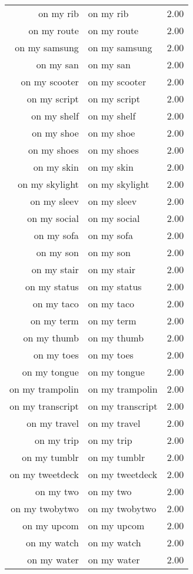 \begin{table}[ht]
\begin{tabular}{rlr}
  on my rib & on my rib & 2.00 \\ 
  on my route & on my route & 2.00 \\ 
  on my samsung & on my samsung & 2.00 \\ 
  on my san & on my san & 2.00 \\ 
  on my scooter & on my scooter & 2.00 \\ 
  on my script & on my script & 2.00 \\ 
  on my shelf & on my shelf & 2.00 \\ 
  on my shoe & on my shoe & 2.00 \\ 
  on my shoes & on my shoes & 2.00 \\ 
  on my skin & on my skin & 2.00 \\ 
  on my skylight & on my skylight & 2.00 \\ 
  on my sleev & on my sleev & 2.00 \\ 
  on my social & on my social & 2.00 \\ 
  on my sofa & on my sofa & 2.00 \\ 
  on my son & on my son & 2.00 \\ 
  on my stair & on my stair & 2.00 \\ 
  on my status & on my status & 2.00 \\ 
  on my taco & on my taco & 2.00 \\ 
  on my term & on my term & 2.00 \\ 
  on my thumb & on my thumb & 2.00 \\ 
  on my toes & on my toes & 2.00 \\ 
  on my tongue & on my tongue & 2.00 \\ 
  on my trampolin & on my trampolin & 2.00 \\ 
  on my transcript & on my transcript & 2.00 \\ 
  on my travel & on my travel & 2.00 \\ 
  on my trip & on my trip & 2.00 \\ 
  on my tumblr & on my tumblr & 2.00 \\ 
  on my tweetdeck & on my tweetdeck & 2.00 \\ 
  on my two & on my two & 2.00 \\ 
  on my twobytwo & on my twobytwo & 2.00 \\ 
  on my upcom & on my upcom & 2.00 \\ 
  on my watch & on my watch & 2.00 \\ 
  on my water & on my water & 2.00 \\ 

\end{tabular}
\end{table}
